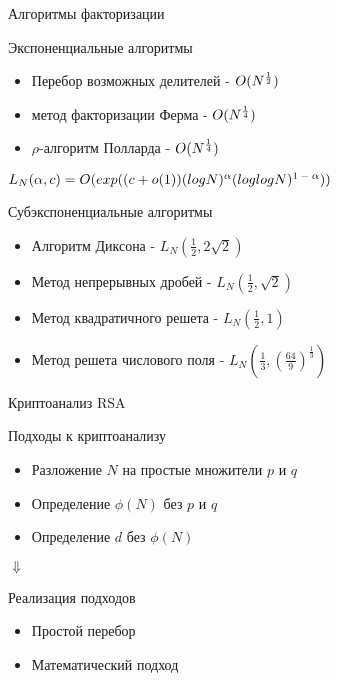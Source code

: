 \begin{frame}{Алгоритмы факторизации}
	\begin{block}{Экспоненциальные алгоритмы}
		\begin{itemize}
			\item Перебор возможных делителей - {$O(N\textsuperscript{{$\frac{1}{2}$}})$}
			\item метод факторизации Ферма - {$O(N\textsuperscript{{$\frac{1}{4}$}})$}
	        \item {$\rho$}-алгоритм Полларда - {$O(N\textsuperscript{{$\frac{1}{4}$}})$}	        
    	\end{itemize}
	\end{block}

	\begin{center}
		$L_N(\alpha,c)=O(exp((c+o(1))(logN)^\alpha(loglogN)\textsuperscript{{$1-\alpha$}}))$
	\end{center}

	\begin{block}{Субэкспоненциальные алгоритмы}
		\begin{itemize}
			\item Алгоритм Диксона - {$L_N(\frac{1}{2}, 2\sqrt{2})$}
	        \item Метод непрерывных дробей - {$L_N(\frac{1}{2}, \sqrt{2})$}
	        \item Метод квадратичного решета - {$L_N(\frac{1}{2}, 1)$}
	        \item Метод решета числового поля - {$L_N(\frac{1}{3}, (\frac{64}{9})^\frac{1}{3})$} 
    	\end{itemize}
	\end{block}
\end{frame}

\begin{frame}{Криптоанализ RSA}
	\begin{center}

		\begin{block}{Подходы к криптоанализу}
			\begin{itemize}
		        \item Разложение $N$ на простые множители $p$ и $q$ \vspace{0.5cm}
		        \item Определение $\phi(N)$ без $p$ и $q$ \vspace{0.5cm}
		        \item Определение $d$ без $\phi(N)$
    		\end{itemize}
		\end{block}	 		

		$\Downarrow$

	 	\begin{block}{Реализация подходов}
	 		\begin{itemize}
		        \item Простой перебор
		        \item Математический подход
    		\end{itemize}
	 	\end{block}	
    
	\end{center}
\end{frame}

